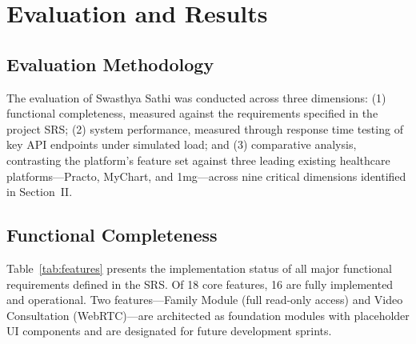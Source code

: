
\section{Evaluation and Results}

\subsection{Evaluation Methodology}

The evaluation of Swasthya Sathi was conducted across three dimensions: (1) functional completeness, measured against the requirements specified in the project SRS; (2) system performance, measured through response time testing of key API endpoints under simulated load; and (3) comparative analysis, contrasting the platform's feature set against three leading existing healthcare platforms—Practo, MyChart, and 1mg—across nine critical dimensions identified in Section~II.

\subsection{Functional Completeness}

Table~\ref{tab:features} presents the implementation status of all major functional requirements defined in the SRS. Of 18 core features, 16 are fully implemented and operational. Two features—Family Module (full read-only access) and Video Consultation (WebRTC)—are architected as foundation modules with placeholder UI components and are designated for future development sprints.

